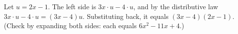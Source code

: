 Let $u=2x-1$. The left side is $3x\cdot u-4\cdot u$, and by the distributive law $3x\cdot u-4\cdot u=(3x-4)u$. Substituting back, it equals $(3x-4)(2x-1)$. (Check by expanding both sides: each equals $6x^2-11x+4$.)

